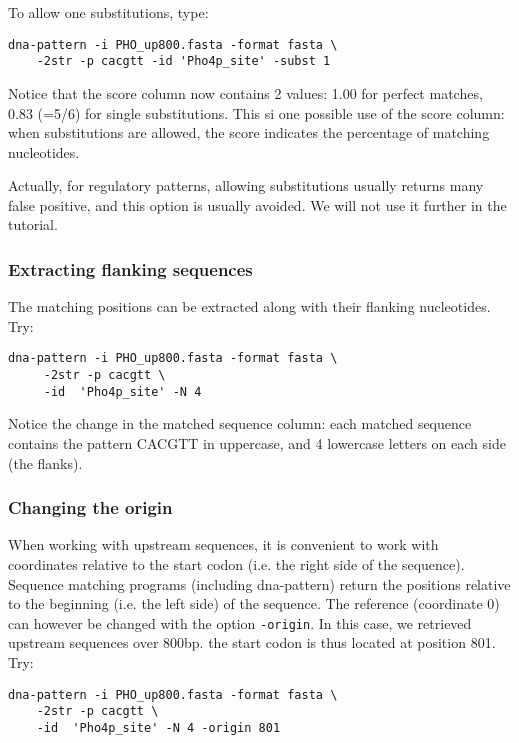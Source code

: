 To allow one substitutions, type:
\begin{verbatim}
dna-pattern -i PHO_up800.fasta -format fasta \
    -2str -p cacgtt -id 'Pho4p_site' -subst 1
\end{verbatim}

Notice that the score column now contains 2 values: 1.00 for perfect
matches, 0.83 (=5/6) for single substitutions. This si one possible
use of the score column: when substitutions are allowed, the score
indicates the percentage of matching nucleotides.

Actually, for regulatory patterns, allowing substitutions usually
returns many false positive, and this option is usually avoided. We
will not use it further in the tutorial.

\subsubsection{Extracting flanking sequences}

The matching positions can be extracted along with their flanking nucleotides. Try:

\begin{verbatim}
dna-pattern -i PHO_up800.fasta -format fasta \
     -2str -p cacgtt \
     -id  'Pho4p_site' -N 4
\end{verbatim}

Notice the change in the matched sequence column: each matched
sequence contains the pattern CACGTT in uppercase, and 4 lowercase
letters on each side (the flanks).

\subsubsection{Changing the origin}

When working with upstream sequences, it is convenient to work with
coordinates relative to the start codon (i.e. the right side of the
sequence). Sequence matching programs (including dna-pattern) return
the positions relative to the beginning (i.e. the left side) of the
sequence. The reference (coordinate 0) can however be changed with
the option \texttt{-origin}. In this case, we retrieved upstream
sequences over 800bp. the start codon is thus located at position
801. Try:

\begin{verbatim}
dna-pattern -i PHO_up800.fasta -format fasta \
    -2str -p cacgtt \
    -id  'Pho4p_site' -N 4 -origin 801
\end{verbatim}

